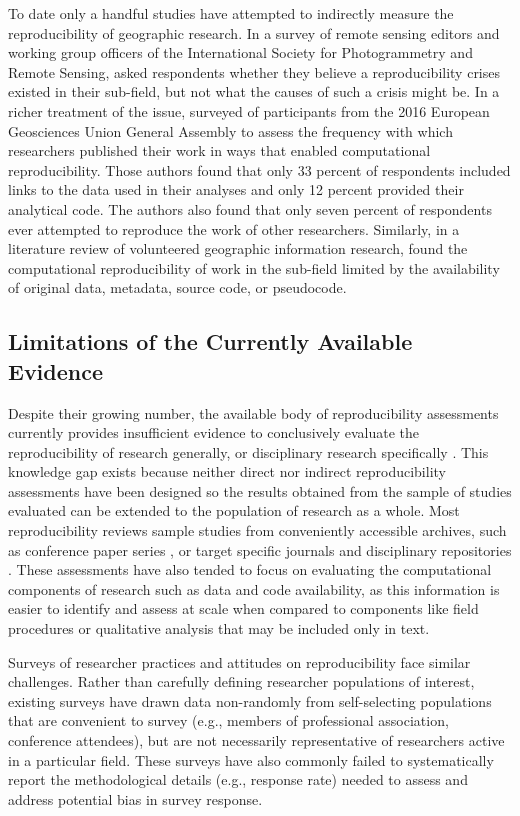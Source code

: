To date only a handful studies have attempted to indirectly measure the reproducibility of geographic research.
In a survey of remote sensing editors and working group officers of the International Society for Photogrammetry and Remote Sensing, \citet{balz2020reproducibility} asked respondents whether they believe a reproducibility crises existed in their sub-field, but not what the causes of such a crisis might be.
In a richer treatment of the issue, \citet{konkol2019} surveyed of participants from the 2016 European Geosciences Union General Assembly to assess the frequency with which researchers published their work in ways that enabled computational reproducibility. 
Those authors found that only 33 percent of respondents included links to the data used in their analyses and only 12 percent provided their analytical code. 
The authors also found that only seven percent of respondents ever attempted to reproduce the work of other researchers.
Similarly, in a literature review of volunteered geographic information research, \citet{ostermann2017} found the computational reproducibility of work in the sub-field limited by the availability of original data, metadata, source code, or pseudocode.

\subsection*{Limitations of the Currently Available Evidence}
Despite their growing number, the available body of reproducibility assessments currently provides insufficient evidence to conclusively evaluate the reproducibility of research generally, or disciplinary research specifically \citep{NASEM2019}.
This knowledge gap exists because neither direct nor indirect reproducibility assessments have been designed so the results obtained from the sample of studies evaluated can be extended to the population of research as a whole.
Most reproducibility reviews sample studies from conveniently accessible archives, such as conference paper series \citep{gundersen2018state, ostermann2017}, or target specific journals and disciplinary repositories \citep{stodden2018empirical, stodden2018enabling, byrne_2017}.
These assessments have also tended to focus on evaluating the computational components of research such as data and code availability, as this information is easier to identify and assess at scale when compared to components like field procedures or qualitative analysis that may be included only in text. 

Surveys of researcher practices and attitudes on reproducibility face similar challenges. 
Rather than carefully defining researcher populations of interest, existing surveys have drawn data non-randomly from self-selecting populations that are convenient to survey (e.g., members of professional association, conference attendees), but are not necessarily representative of researchers active in a particular field. 
These surveys have also commonly failed to systematically report the methodological details (e.g., response rate) needed to assess and address potential bias in survey response. 